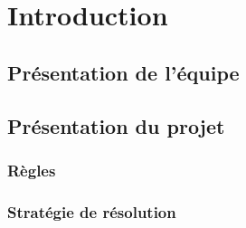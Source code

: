 \chapter{Introduction}

\section{Présentation de l'équipe}

\section{Présentation du projet}
\subsection{Règles}
\subsection{Stratégie de résolution}
